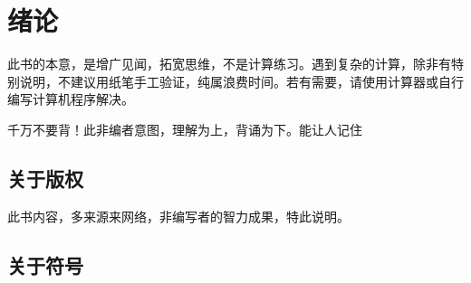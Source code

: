 
\chapter{绪论}
\label{chap:introduction}

此书的本意，是增广见闻，拓宽思维，不是计算练习。遇到复杂的计算，除非有特别说明，不建议用纸笔手工验证，纯属浪费时间。若有需要，请使用计算器或自行编写计算机程序解决。

千万不要背！此非编者意图，理解为上，背诵为下。能让人记住

\section{关于版权}
\label{sec:copyright}

此书内容，多来源来网络，非编写者的智力成果，特此说明。

\section{关于符号}
\label{sec:symbol}


